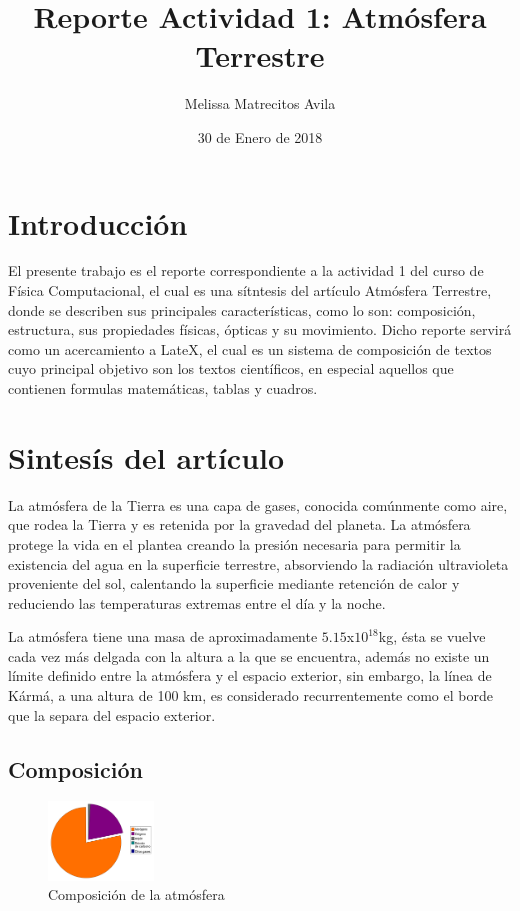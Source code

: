 \documentclass{article} %
\title{Reporte Actividad 1: Atmósfera Terrestre}
\author{Melissa Matrecitos Avila}
\date{30 de Enero de 2018}
\begin{document}
\maketitle

\section{Introducción}
El presente trabajo es el reporte correspondiente a la actividad 1 del curso de Física Computacional, el cual es una sítntesis del artículo Atmósfera Terrestre, donde se describen sus principales características, como lo son: composición, estructura, sus propiedades físicas, ópticas y su movimiento.
Dicho reporte servirá como un acercamiento a LateX, el cual es un sistema de composición de textos cuyo principal objetivo son los textos científicos, en especial aquellos que contienen formulas matemáticas, tablas y cuadros.


\section{Sintesís del artículo}

La atmósfera de la Tierra es una capa de gases, conocida comúnmente como aire, que rodea la Tierra y es retenida por la gravedad del planeta. La atmósfera protege la vida en el plantea creando la presión necesaria para permitir la existencia del agua en la superficie terrestre, absorviendo la radiación ultravioleta proveniente del sol, calentando la superficie mediante retención de calor y reduciendo las temperaturas extremas entre el día y la noche.
 
La atmósfera tiene una masa de aproximadamente $5.15$x$10^{18}$kg, ésta se vuelve cada vez más delgada con la altura a la que se encuentra, además no existe un límite definido entre la atmósfera y el espacio exterior, sin embargo, la línea de Kármá, a una altura de 100 km, es considerado recurrentemente como el borde que la separa del espacio exterior.

\subsection{Composición}

\begin{figure}
  \centering
  \includegraphics[width=0.25\textwidth]{Composicion.png}
  \caption{Composición de la atmósfera}
  \label{fig:composicion}
\end{figure}
\end{document}

